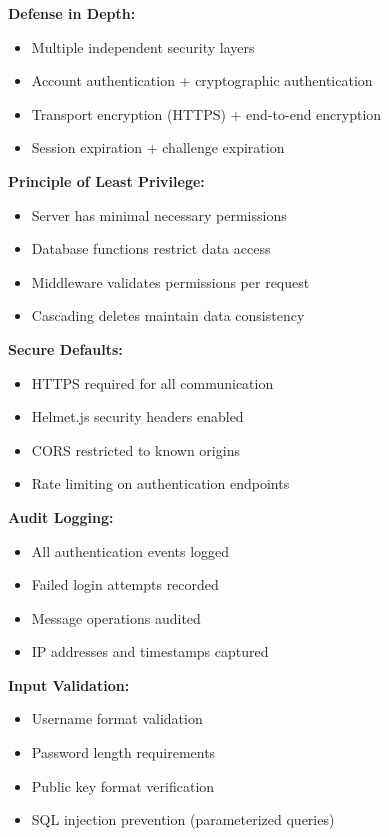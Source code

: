 \textbf{Defense in Depth:}
\begin{itemize}
    \item Multiple independent security layers
    \item Account authentication + cryptographic authentication
    \item Transport encryption (HTTPS) + end-to-end encryption
    \item Session expiration + challenge expiration
\end{itemize}

\textbf{Principle of Least Privilege:}
\begin{itemize}
    \item Server has minimal necessary permissions
    \item Database functions restrict data access
    \item Middleware validates permissions per request
    \item Cascading deletes maintain data consistency
\end{itemize}

\textbf{Secure Defaults:}
\begin{itemize}
    \item HTTPS required for all communication
    \item Helmet.js security headers enabled
    \item CORS restricted to known origins
    \item Rate limiting on authentication endpoints
\end{itemize}

\textbf{Audit Logging:}
\begin{itemize}
    \item All authentication events logged
    \item Failed login attempts recorded
    \item Message operations audited
    \item IP addresses and timestamps captured
\end{itemize}

\textbf{Input Validation:}
\begin{itemize}
    \item Username format validation
    \item Password length requirements
    \item Public key format verification
    \item SQL injection prevention (parameterized queries)
\end{itemize}

